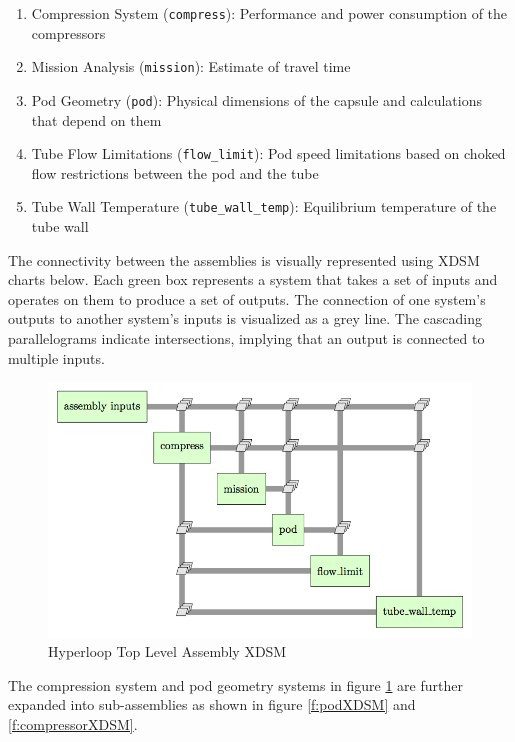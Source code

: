\documentclass[heading.tex]{subfiles}
\begin{document}
\begin{enumerate}
  \item Compression System (\texttt{compress}): Performance and power consumption of the compressors
  \item Mission Analysis (\texttt{mission}): Estimate of travel time
  \item Pod Geometry (\texttt{pod}): Physical dimensions of the capsule and calculations that depend on them
  \item Tube Flow Limitations (\texttt{flow\_limit}): Pod speed limitations based on choked flow restrictions between the pod and the tube
  \item Tube Wall Temperature (\texttt{tube\_wall\_temp}): Equilibrium temperature of the tube wall
\end{enumerate}

The connectivity between the assemblies is visually represented using XDSM charts below. Each green box represents a system that takes a
set of inputs and operates on them to produce a set of outputs. The connection of one system's outputs to another system's inputs is
visualized as a grey line. The cascading parallelograms indicate intersections, implying that an output is connected to multiple inputs. 


\begin{figure}[hbtp]
\centering
\includegraphics[width=\textwidth]{images/hyperloop_assembly_xdsm.png}
\caption{Hyperloop Top Level Assembly XDSM}
\label{f:hyperloopXDSM}
\end{figure}

The compression system and pod geometry systems in figure \ref{f:hyperloopXDSM} are further expanded into sub-assemblies as shown in figure \ref{f:podXDSM} and \ref{f:compressorXDSM}.
\end{document}
